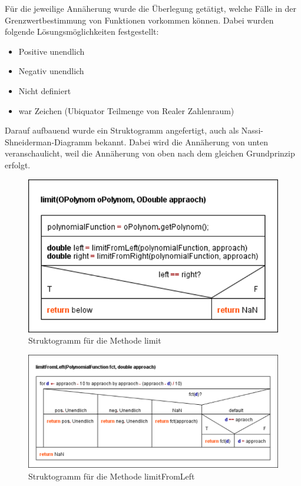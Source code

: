 Für die jeweilige Annäherung wurde die Überlegung getätigt, welche Fälle in der Grenzwertbestimmung von Funktionen vorkommen können. Dabei wurden folgende Lösungsmöglichkeiten festgestellt:
\begin{itemize}
	\item Positive unendlich
	\item Negativ unendlich
	\item Nicht definiert
	\item {} war Zeichen (Ubiquator Teilmenge von Realer Zahlenraum)
\end{itemize}

Darauf aufbauend wurde ein Struktogramm angefertigt, auch als Nassi-Shneiderman-Diagramm bekannt. Dabei wird die Annäherung von unten veranschaulicht, weil die Annäherung von oben nach dem gleichen Grundprinzip erfolgt. 

\begin{figure}[!h]
	\includegraphics[scale=1]{img/struktogramm-limit}
	\caption[Struktogramm für die Methode limit]{Struktogramm für die Methode limit\footnotemark}
\end{figure}


\begin{figure}[!h]
	\includegraphics[scale=1]{img/struktogramm-limitFromLeft}
	\caption[Struktogramm für die Methode limitFromLeft]{Struktogramm für die Methode limitFromLeft\footnotemark}
\end{figure}
\FloatBarrier

